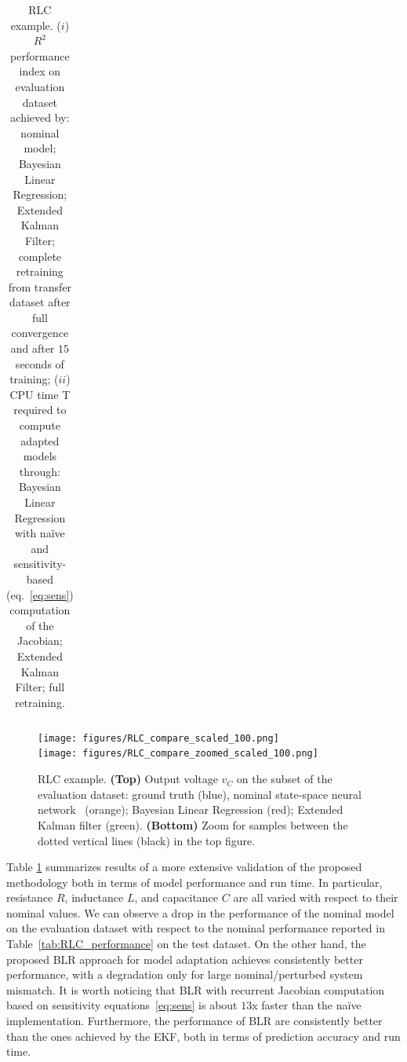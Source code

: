 \documentclass{article}
\begin{document}
\begin{table}
{\begin{tabular}{c | c | c  c | c  c | c  c | c c c}
\hline
\end{tabular}%
}
\caption{RLC example. ($i$) $R^2$ performance index on evaluation dataset achieved by: nominal model; Bayesian Linear Regression; Extended Kalman Filter; complete retraining from transfer dataset after full convergence and after $15$ seconds of training;  ($ii$) CPU time T required to compute adapted models through: Bayesian Linear Regression with na{\"i}ve and sensitivity-based (eq.~\eqref{eq:sens}) computation of  the Jacobian; Extended Kalman Filter; full retraining.}
\label{tab:RLC_sim2real_compare}
\end{table}


\begin{figure}%
    \centering
\texttt{[image: figures/RLC\_compare\_scaled\_100.png]}\\
\texttt{[image: figures/RLC\_compare\_zoomed\_scaled\_100.png]}
    \caption{RLC example. \textbf{(Top)} Output voltage $v_C$ on the subset of the evaluation dataset: ground truth (blue), nominal state-space neural network~\cite{forgione2021continuous} (orange); Bayesian Linear Regression (red); Extended Kalman filter (green).
    \textbf{(Bottom)} Zoom for samples between the dotted vertical lines (black) in the top figure.}
    \label{RLC-prediction-compare-zoom}
\end{figure}

Table \ref{tab:RLC_sim2real_compare} summarizes results of a more extensive validation of the proposed methodology  both in terms of model performance and run time. In particular,  resistance $R$, inductance $L$, and capacitance $C$ are all varied with respect to their nominal values.    
We can observe a drop in the performance of the nominal model on the evaluation dataset with respect to the nominal  performance reported in Table~\ref{tab:RLC_performance} on the test dataset. On the other hand, the proposed  BLR approach for model adaptation achieves consistently better performance, with a  degradation only for large nominal/perturbed system mismatch. It is worth noticing that BLR with recurrent Jacobian computation based on sensitivity equations~\eqref{eq:sens} is about $13$x faster than the na{\"i}ve implementation. 
Furthermore, the performance of BLR are consistently better than the ones achieved by the EKF, both in terms of prediction accuracy and run time. 
\end{document}
